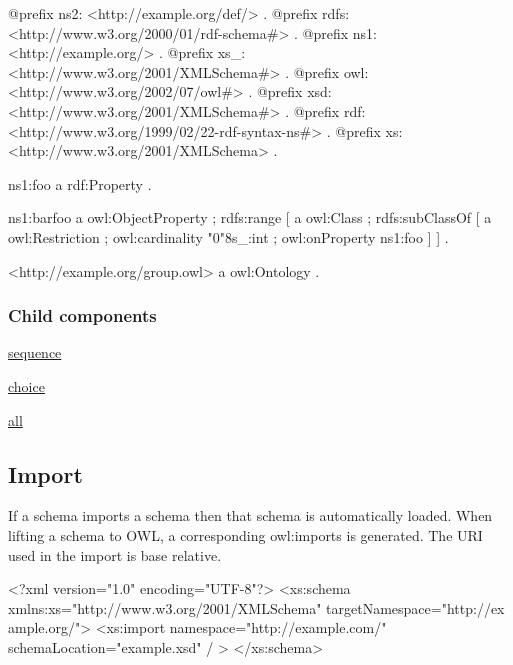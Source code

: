 \begin{DoxyCodeInclude}
@prefix ns2:     <http://example.org/def/> .
@prefix rdfs:    <http://www.w3.org/2000/01/rdf-schema#> .
@prefix ns1:     <http://example.org/> .
@prefix xs_:     <http://www.w3.org/2001/XMLSchema#> .
@prefix owl:     <http://www.w3.org/2002/07/owl#> .
@prefix xsd:     <http://www.w3.org/2001/XMLSchema#> .
@prefix rdf:     <http://www.w3.org/1999/02/22-rdf-syntax-ns#> .
@prefix xs:      <http://www.w3.org/2001/XMLSchema> .

ns1:foo
      a       rdf:Property .

ns1:barfoo
      a       owl:ObjectProperty ;
      rdfs:range
              [ a       owl:Class ;
                rdfs:subClassOf
                        [ a       owl:Restriction ;
                          owl:cardinality "0"^^xs_:int ;
                          owl:onProperty ns1:foo
                        ]
              ] .

<http://example.org/group.owl>
      a       owl:Ontology .
\end{DoxyCodeInclude}
\hypertarget{group_groupChildren}{}\subsubsection{Child components}\label{group_groupChildren}

\begin{DoxyItemize}
\item \hyperlink{sequence}{sequence}
\item \hyperlink{choice}{choice}
\item \hyperlink{all}{all} 
\end{DoxyItemize}\hypertarget{import}{}\subsection{Import}\label{import}
If a schema imports a schema then that schema is automatically loaded. When lifting a schema to OWL, a corresponding owl:imports is generated. The URI used in the import is base relative.


\begin{DoxyCodeInclude}
<?xml version="1.0" encoding="UTF-8"?>
<xs:schema xmlns:xs="http://www.w3.org/2001/XMLSchema" targetNamespace="http://ex
      ample.org/">
        <xs:import namespace="http://example.com/" schemaLocation="example.xsd" /
      >
</xs:schema>
\end{DoxyCodeInclude}
 
